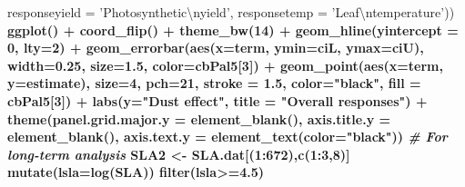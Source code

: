 \documentclass[]{scrartcl}
\newenvironment{Shaded}{\begin{snugshade}}{\end{snugshade}}
\newcommand{\CharTok}[1]{\textcolor[rgb]{0.31,0.60,0.02}{#1}}
\newcommand{\CommentTok}[1]{\textcolor[rgb]{0.56,0.35,0.01}{\textit{#1}}}
\newcommand{\DataTypeTok}[1]{\textcolor[rgb]{0.13,0.29,0.53}{#1}}
\newcommand{\DecValTok}[1]{\textcolor[rgb]{0.00,0.00,0.81}{#1}}
\newcommand{\FloatTok}[1]{\textcolor[rgb]{0.00,0.00,0.81}{#1}}
\newcommand{\KeywordTok}[1]{\textcolor[rgb]{0.13,0.29,0.53}{\textbf{#1}}}
\newcommand{\NormalTok}[1]{#1}
\newcommand{\OperatorTok}[1]{\textcolor[rgb]{0.81,0.36,0.00}{\textbf{#1}}}
\newcommand{\StringTok}[1]{\textcolor[rgb]{0.31,0.60,0.02}{#1}}
\begin{document}
\begin{Shaded}
\begin{Highlighting}[]
{{{{{{{{{{{{{{{{{{{{{              \DataTypeTok{responseyield =} \StringTok{'Photosynthetic}\CharTok{\textbackslash{}n}\StringTok{yield'}\NormalTok{, }
              \DataTypeTok{responsetemp =} \StringTok{'Leaf}\CharTok{\textbackslash{}n}\StringTok{temperature'}\NormalTok{)) }\OperatorTok{%
\StringTok{   }\KeywordTok{ggplot}\NormalTok{() }\OperatorTok{+}
\StringTok{   }\KeywordTok{coord_flip}\NormalTok{() }\OperatorTok{+}\StringTok{  }\KeywordTok{theme_bw}\NormalTok{(}\DecValTok{14}\NormalTok{) }\OperatorTok{+}
\StringTok{  }\KeywordTok{geom_hline}\NormalTok{(}\DataTypeTok{yintercept =} \DecValTok{0}\NormalTok{, }\DataTypeTok{lty=}\DecValTok{2}\NormalTok{) }\OperatorTok{+}\StringTok{ }
\StringTok{      }\KeywordTok{geom_errorbar}\NormalTok{(}\KeywordTok{aes}\NormalTok{(}\DataTypeTok{x=}\NormalTok{term,}
               \DataTypeTok{ymin=}\NormalTok{ciL, }\DataTypeTok{ymax=}\NormalTok{ciU), }
                 \DataTypeTok{width=}\FloatTok{0.25}\NormalTok{, }
               \DataTypeTok{size=}\FloatTok{1.5}\NormalTok{, }
               \DataTypeTok{color=}\NormalTok{cbPal5[}\DecValTok{3}\NormalTok{]) }\OperatorTok{+}
\StringTok{   }\KeywordTok{geom_point}\NormalTok{(}\KeywordTok{aes}\NormalTok{(}\DataTypeTok{x=}\NormalTok{term, }\DataTypeTok{y=}\NormalTok{estimate), }
              \DataTypeTok{size=}\DecValTok{4}\NormalTok{, }
              \DataTypeTok{pch=}\DecValTok{21}\NormalTok{, }
              \DataTypeTok{stroke =} \FloatTok{1.5}\NormalTok{, }
              \DataTypeTok{color=}\StringTok{"black"}\NormalTok{, }
              \DataTypeTok{fill =}\NormalTok{ cbPal5[}\DecValTok{3}\NormalTok{]) }\OperatorTok{+}\StringTok{ }
\StringTok{   }\KeywordTok{labs}\NormalTok{(}\DataTypeTok{y=}\StringTok{"Dust effect"}\NormalTok{, }
        \DataTypeTok{title =} \StringTok{"Overall responses"}\NormalTok{) }\OperatorTok{+}
\StringTok{   }\KeywordTok{theme}\NormalTok{(}\DataTypeTok{panel.grid.major.y =} \KeywordTok{element_blank}\NormalTok{(),}
         \DataTypeTok{axis.title.y =} \KeywordTok{element_blank}\NormalTok{(), }
         \DataTypeTok{axis.text.y =} \KeywordTok{element_text}\NormalTok{(}\DataTypeTok{color=}\StringTok{"black"}\NormalTok{)) }
\CommentTok{# For long-term analysis}
\NormalTok{  SLA2 <-}\StringTok{ }\NormalTok{SLA.dat[(}\DecValTok{1}\OperatorTok{:}\DecValTok{672}\NormalTok{),}\KeywordTok{c}\NormalTok{(}\DecValTok{1}\OperatorTok{:}\DecValTok{3}\NormalTok{,}\DecValTok{8}\NormalTok{)] }\OperatorTok{%
\StringTok{             }\KeywordTok{mutate}\NormalTok{(}\DataTypeTok{lsla=}\KeywordTok{log}\NormalTok{(SLA)) }\OperatorTok{%
\StringTok{             }\KeywordTok{filter}\NormalTok{(lsla}\OperatorTok{>=}\FloatTok{4.5}\NormalTok{) }\OperatorTok{%
}}}}}}}}}}}}}}}}}}}}}}}}}
\end{Highlighting}
\end{Shaded}
\end{document}
